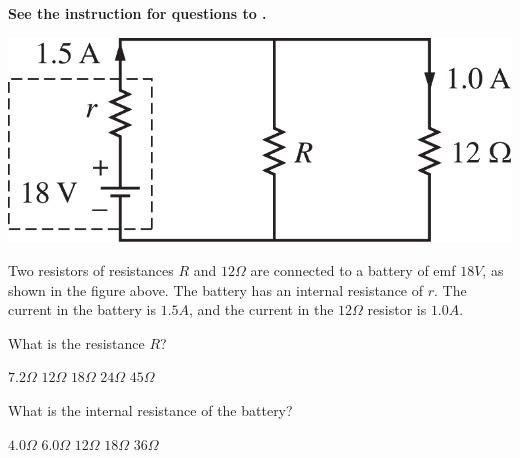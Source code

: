 
\textbf{See the instruction for questions  to .} 

\begin{center}
\includegraphics[scale=0.3]{images/img-008-009.png}
\end{center}

Two resistors of resistances $R$ and $12 \unit{\Omega}$ are connected to a battery of emf $18 \unit{V}$, as shown in the figure above. The battery has an internal resistance of $r$. The current in the battery is $1.5 \unit{A}$, and the current in the $12 \unit{\Omega}$ resistor is $1.0 \unit{A}$.

\begin{questions}
\setcounter{question}{15}

\question
What is the resistance $R$?

\begin{oneparchoices}
    \choice $7.2 \unit{\Omega}$
    \choice $12 \unit{\Omega}$
    \choice $18 \unit{\Omega}$
    \choice $24 \unit{\Omega}$
    \choice $45 \unit{\Omega}$
\end{oneparchoices}

\question
What is the internal resistance of the battery?

\begin{oneparchoices}
    \choice $4.0 \unit{\Omega}$
    \choice $6.0 \unit{\Omega}$
    \choice $12 \unit{\Omega}$
    \choice $18 \unit{\Omega}$
    \choice $36 \unit{\Omega}$
\end{oneparchoices}

\end{questions}
